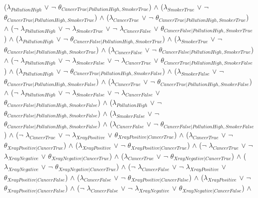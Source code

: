 \documentclass[a4paper,10pt]{report}
\begin{document}
\begin{center}
 ($\lambda_{PollutionHigh}$ $\lor$ $\neg$ $\theta_{CancerTrue|PollutionHigh,SmokerTrue}$) $\land$ 
 ($\lambda_{SmokerTrue}$ $\lor$ $\neg$ $\theta_{CancerTrue|PollutionHigh,SmokerTrue}$) $\land$ 
 ($\lambda_{CancerTrue}$ $\lor$ $\neg$ $\theta_{CancerTrue|PollutionHigh,SmokerTrue}$) $\land$ 
 ($\neg$ $\lambda_{PollutionHigh}$ $\lor$ $\neg$ $\lambda_{SmokerTrue}$ $\lor$ $\neg$ $\lambda_{CancerFalse}$ $\lor$ $\theta_{CancerFalse|PollutionHigh,SmokerTrue}$) $\land$ 
 ($\lambda_{PollutionHigh}$ $\lor$ $\neg$ $\theta_{CancerFalse|PollutionHigh,SmokerTrue}$) $\land$ 
 ($\lambda_{SmokerTrue}$ $\lor$ $\neg$ $\theta_{CancerFalse|PollutionHigh,SmokerTrue}$) $\land$ 
 ($\lambda_{CancerFalse}$ $\lor$ $\neg$ $\theta_{CancerFalse|PollutionHigh,SmokerTrue}$) $\land$ 
 ($\neg$ $\lambda_{PollutionHigh}$ $\lor$ $\neg$ $\lambda_{SmokerFalse}$ $\lor$ $\neg$ $\lambda_{CancerTrue}$ $\lor$ $\theta_{CancerTrue|PollutionHigh,SmokerFalse}$) $\land$ 
 ($\lambda_{PollutionHigh}$ $\lor$ $\neg$ $\theta_{CancerTrue|PollutionHigh,SmokerFalse}$) $\land$ 
 ($\lambda_{SmokerFalse}$ $\lor$ $\neg$ $\theta_{CancerTrue|PollutionHigh,SmokerFalse}$) $\land$ 
 ($\lambda_{CancerTrue}$ $\lor$ $\neg$ $\theta_{CancerTrue|PollutionHigh,SmokerFalse}$) $\land$ 
 ($\neg$ $\lambda_{PollutionHigh}$ $\lor$ $\neg$ $\lambda_{SmokerFalse}$ $\lor$ $\neg$ $\lambda_{CancerFalse}$ $\lor$ $\theta_{CancerFalse|PollutionHigh,SmokerFalse}$) $\land$ 
 ($\lambda_{PollutionHigh}$ $\lor$ $\neg$ $\theta_{CancerFalse|PollutionHigh,SmokerFalse}$) $\land$ 
 ($\lambda_{SmokerFalse}$ $\lor$ $\neg$ $\theta_{CancerFalse|PollutionHigh,SmokerFalse}$) $\land$ 
 ($\lambda_{CancerFalse}$ $\lor$ $\neg$ $\theta_{CancerFalse|PollutionHigh,SmokerFalse}$) $\land$ 
 ($\neg$ $\lambda_{CancerTrue}$ $\lor$ $\neg$ $\lambda_{XrayPositive}$ $\lor$ $\theta_{XrayPositive|CancerTrue}$) $\land$ 
 ($\lambda_{CancerTrue}$ $\lor$ $\neg$ $\theta_{XrayPositive|CancerTrue}$) $\land$ 
 ($\lambda_{XrayPositive}$ $\lor$ $\neg$ $\theta_{XrayPositive|CancerTrue}$) $\land$ 
 ($\neg$ $\lambda_{CancerTrue}$ $\lor$ $\neg$ $\lambda_{XrayNegative}$ $\lor$ $\theta_{XrayNegative|CancerTrue}$) $\land$ 
 ($\lambda_{CancerTrue}$ $\lor$ $\neg$ $\theta_{XrayNegative|CancerTrue}$) $\land$ 
 ($\lambda_{XrayNegative}$ $\lor$ $\neg$ $\theta_{XrayNegative|CancerTrue}$) $\land$ 
 ($\neg$ $\lambda_{CancerFalse}$ $\lor$ $\neg$ $\lambda_{XrayPositive}$ $\lor$ $\theta_{XrayPositive|CancerFalse}$) $\land$ 
 ($\lambda_{CancerFalse}$ $\lor$ $\neg$ $\theta_{XrayPositive|CancerFalse}$) $\land$ 
 ($\lambda_{XrayPositive}$ $\lor$ $\neg$ $\theta_{XrayPositive|CancerFalse}$) $\land$ 
 ($\neg$ $\lambda_{CancerFalse}$ $\lor$ $\neg$ $\lambda_{XrayNegative}$ $\lor$ $\theta_{XrayNegative|CancerFalse}$) $\land$ 

\end{center}
\end{document}
